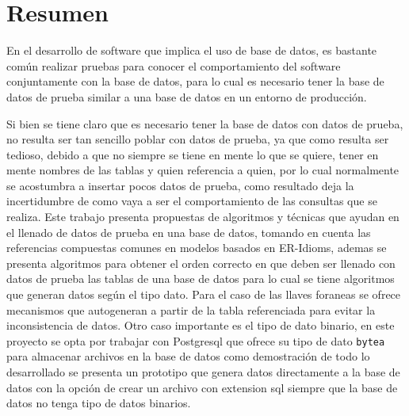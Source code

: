 \chapter*{Resumen}
\thispagestyle{empty}
\renewcommand{\footrulewidth}{0.0pt}%
En el desarrollo de software que implica el uso de base de datos, es bastante com\'un realizar pruebas para conocer el comportamiento del software conjuntamente con la base de datos, para lo cual es necesario tener la base de datos de prueba similar a una base de datos en un entorno de producci\'on. 

Si bien se tiene claro que es necesario tener la base de datos con datos de prueba, no resulta ser tan sencillo poblar con datos de prueba, ya que como resulta ser tedioso, debido a que no siempre se tiene en mente lo que se quiere, tener en mente nombres de las tablas y quien referencia a quien, por lo cual normalmente se acostumbra a insertar pocos datos de prueba, como resultado deja la incertidumbre de como vaya a ser el comportamiento de las consultas que se realiza. Este trabajo presenta propuestas de algoritmos y t\'ecnicas  que ayudan en el llenado de datos de prueba en una base de datos, tomando en cuenta las referencias compuestas comunes en modelos basados en ER-Idioms, ademas se presenta algoritmos para obtener el orden correcto en que deben ser llenado con datos de prueba las tablas de una base de datos para lo cual se tiene algoritmos que generan datos seg\'un el tipo dato. Para el caso de las llaves foraneas se ofrece mecanismos que autogeneran a partir de la tabla referenciada para evitar la inconsistencia de datos. Otro caso importante es el tipo de dato binario, en este proyecto se opta por trabajar con Postgresql que ofrece su tipo de dato \texttt{bytea} para almacenar archivos en la base de datos como demostraci\'on de todo lo desarrollado se presenta un prototipo que genera datos directamente a la base de datos con la opci\'on de crear un archivo con extension sql siempre que la base de datos no tenga tipo de datos binarios.
